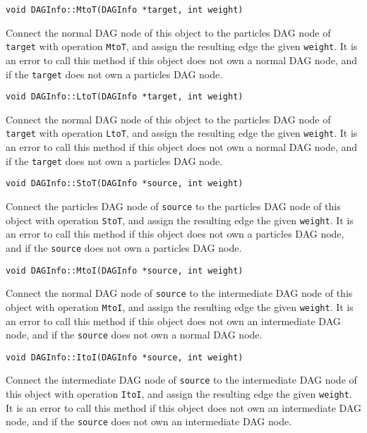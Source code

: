 \begin{lstlisting}
void DAGInfo::MtoT(DAGInfo *target, int weight)
\end{lstlisting}

\noindent Connect the normal DAG node of this object to the particles DAG
node of \texttt{target} with operation \texttt{MtoT}, and assign the
resulting edge the given \texttt{weight}. It is an error to call this method
if this object does not own a normal DAG node, and if the \texttt{target}
does not own a particles DAG node.

\begin{lstlisting}
void DAGInfo::LtoT(DAGInfo *target, int weight)
\end{lstlisting}

\noindent Connect the normal DAG node of this object to the particles DAG
node of \texttt{target} with operation \texttt{LtoT}, and assign the
resulting edge the given \texttt{weight}. It is an error to call this method
if this object does not own a normal DAG node, and if the \texttt{target}
does not own a particles DAG node.

\begin{lstlisting}
void DAGInfo::StoT(DAGInfo *source, int weight)
\end{lstlisting}

\noindent Connect the particles DAG node of \texttt{source} to the particles
DAG node of this object with operation \texttt{StoT}, and assign the
resulting edge the given \texttt{weight}. It is an error to call this method
if this object does not own a particles DAG node, and if the \texttt{source}
does not own a particles DAG node.

\begin{lstlisting}
void DAGInfo::MtoI(DAGInfo *source, int weight)
\end{lstlisting}

\noindent Connect the normal DAG node of \texttt{source} to the intermediate
DAG node of this object with operation \texttt{MtoI}, and assign the
resulting edge the given \texttt{weight}. It is an error to call this method
if this object does not own an intermediate DAG node, and if the
\texttt{source} does not own a normal DAG node.

\begin{lstlisting}
void DAGInfo::ItoI(DAGInfo *source, int weight)
\end{lstlisting}

\noindent Connect the intermediate DAG node of \texttt{source} to the
intermediate DAG node of this object with operation \texttt{ItoI}, and
assign the resulting edge the given \texttt{weight}. It is an error to call
this method if this object does not own an intermediate DAG node, and if the
\texttt{source} does not own an intermediate DAG node.

